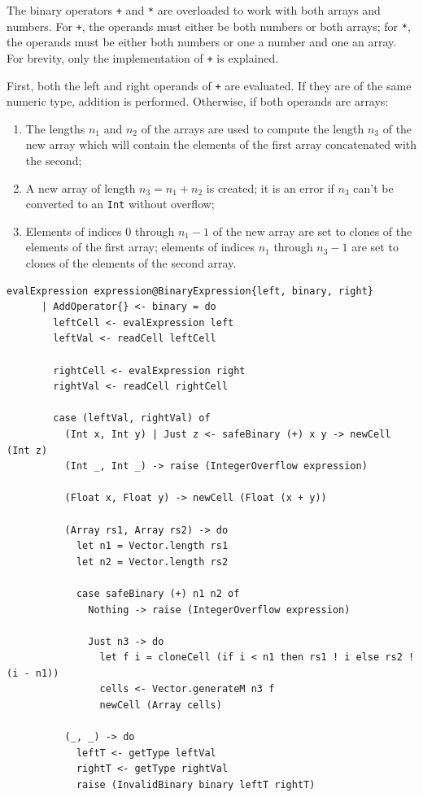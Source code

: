 \documentclass[UdineBachThesis,american,11pt]{PhdThesis}
\begin{document}
  The binary operators \texttt{+} and \texttt{*} are overloaded to work with
  both arrays and numbers. For \texttt{+}, the operands must either be both
  numbers or both arrays; for \texttt{*}, the operands must be either both
  numbers or one a number and one an array. For brevity, only the implementation
  of \texttt{+} is explained.

  First, both the left and right operands of \texttt{+} are evaluated. If they
  are of the same numeric type, addition is performed. Otherwise, if both
  operands are arrays:

  \begin{enumerate}
    \item The lengths \mbox{$n_1$} and \mbox{$n_2$} of the arrays are used to
    compute the length \mbox{$n_3$} of the new array which will contain the
    elements of the first array concatenated with the second;

    \item A new array of length \mbox{$n_3 = n_1 + n_2$} is created; it is an
    error if \mbox{$n_3$} can't be converted to an \mbox{\texttt{Int}} without
    overflow;

    \item Elements of indices $0$ through \mbox{$n_1 - 1$} of the new array are
    set to clones of the elements of the first array; elements of indices
    \mbox{$n_1$} through \mbox{$n_3 - 1$} are set to clones of the elements of
    the second array.
  \end{enumerate}

  \begin{Verbatim}[gobble=4,fontsize=\small]
    evalExpression expression@BinaryExpression{left, binary, right}
      | AddOperator{} <- binary = do
        leftCell <- evalExpression left
        leftVal <- readCell leftCell

        rightCell <- evalExpression right
        rightVal <- readCell rightCell

        case (leftVal, rightVal) of
          (Int x, Int y) | Just z <- safeBinary (+) x y -> newCell (Int z)
          (Int _, Int _) -> raise (IntegerOverflow expression)

          (Float x, Float y) -> newCell (Float (x + y))

          (Array rs1, Array rs2) -> do
            let n1 = Vector.length rs1
            let n2 = Vector.length rs2

            case safeBinary (+) n1 n2 of
              Nothing -> raise (IntegerOverflow expression)

              Just n3 -> do
                let f i = cloneCell (if i < n1 then rs1 ! i else rs2 ! (i - n1))
                cells <- Vector.generateM n3 f
                newCell (Array cells)

          (_, _) -> do
            leftT <- getType leftVal
            rightT <- getType rightVal
            raise (InvalidBinary binary leftT rightT)
  \end{Verbatim}
\end{document}
